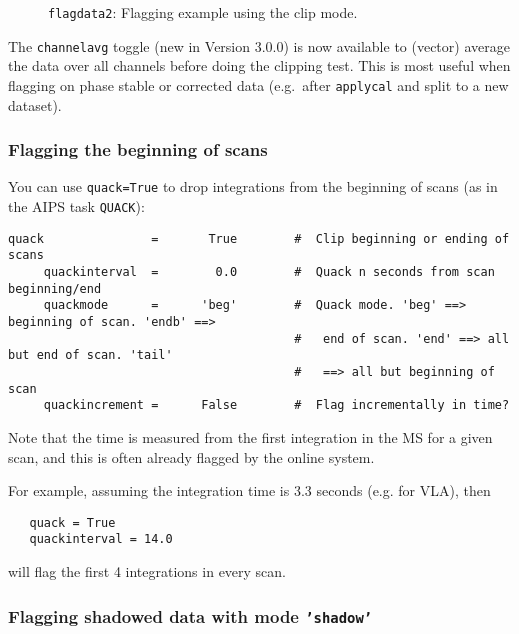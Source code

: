 \begin{figure}[h!]
\begin{center}
\caption{\label{fig:flagdata} {\tt flagdata2}: Flagging example using the clip mode. }
\hrulefill
\end{center}
\end{figure}

The {\tt channelavg} toggle (new in Version 3.0.0) is now available
to (vector) average the data over all channels before doing the
clipping test.  This is most useful when flagging on phase stable or
corrected data (e.g.\ after {\tt applycal} and split to a new
dataset).

\subsubsection{Flagging the beginning of scans}
\label{section:edit.flagdata.quack}

You can use {\tt quack=True} to drop integrations from
the beginning of scans (as in the AIPS task {\tt QUACK}):
\small
\begin{verbatim}
quack               =       True        #  Clip beginning or ending of scans
     quackinterval  =        0.0        #  Quack n seconds from scan beginning/end
     quackmode      =      'beg'        #  Quack mode. 'beg' ==> beginning of scan. 'endb' ==>
                                        #   end of scan. 'end' ==> all but end of scan. 'tail'
                                        #   ==> all but beginning of scan
     quackincrement =      False        #  Flag incrementally in time?
\end{verbatim}
\normalsize
Note that the time is measured from the first integration in the MS
for a given scan, and this is often already flagged by the online
system.

For example, assuming the integration time is 3.3 seconds (e.g. for
VLA), then
\small
\begin{verbatim}
   quack = True
   quackinterval = 14.0 
\end{verbatim}
\normalsize
will flag the first 4 integrations in every scan.

\subsubsection{Flagging shadowed data with mode {\tt 'shadow'} }
\label{section:edit.flagdata.shadow}


